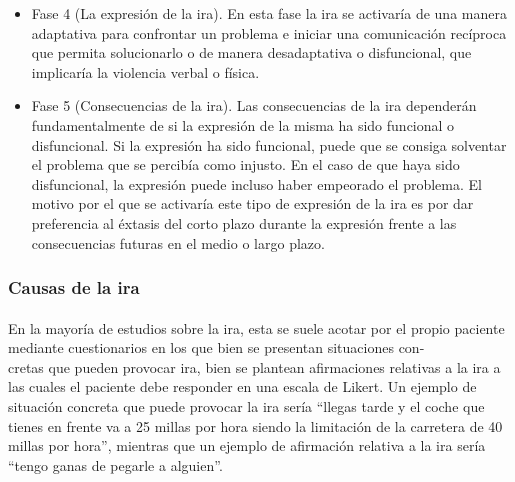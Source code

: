 \begin{itemize}
    \item Fase 4 (La expresión de la ira). En esta fase la ira se activaría de una manera adaptativa para confrontar un problema e iniciar una comunicación recíproca que permita solucionarlo o de manera desadaptativa o disfuncional, que implicaría la violencia verbal o física. 
    
    \item Fase 5 (Consecuencias de la ira). Las consecuencias de la ira dependerán fundamentalmente de si la expresión de la misma ha sido funcional o disfuncional. Si la expresión ha sido funcional, puede que se consiga solventar el problema que se percibía como injusto. En el caso de que haya sido disfuncional, la expresión puede incluso haber empeorado el problema. El motivo por el que se activaría este tipo de expresión de la ira es por dar preferencia al éxtasis del corto plazo durante la expresión frente a las consecuencias futuras en el medio o largo plazo.
\end{itemize}

\subsubsection{Causas de la ira}
\paragraph{}
En la mayoría de estudios sobre la ira, esta se suele acotar por el propio paciente mediante cuestionarios en los que bien se presentan situaciones con- \\ cretas que pueden provocar ira, bien se plantean afirmaciones relativas a la ira a las cuales el paciente debe responder en una escala de Likert. Un ejemplo de situación concreta que puede provocar la ira sería ``llegas tarde y el coche que tienes en frente va a 25 millas por hora siendo la limitación de la carretera de 40 millas por hora'', mientras que un ejemplo de afirmación relativa a la ira sería ``tengo ganas de pegarle a alguien''.

